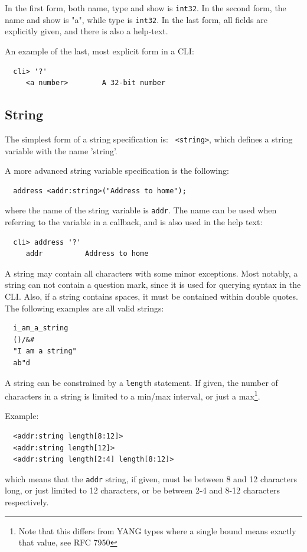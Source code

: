 \documentclass[a4paper, 10pt] {article}
\begin{document}
In the first form, both name, type and show is {\tt int32}. In the
second form, the name and show is "a", while type is {\tt int32}. 
In the last form, all fields are explicitly given, and there is also a help-text.

An example of the last, most explicit form in a CLI:
\begin{verbatim}
  cli> '?'
     <a number>        A 32-bit number
\end{verbatim}

\subsection{String}
The simplest form of a string specification is: {\tt
<string>}, which defines a string variable with the name 'string'.

A more advanced string variable specification is the following:
\begin{verbatim}
  address <addr:string>("Address to home");
\end{verbatim}
where the name of the string variable is {\tt addr}. The name can be used when referring to the variable in a callback, and is also used in the help text:
\begin{verbatim}
  cli> address '?'
     addr          Address to home
\end{verbatim}

A string may contain all characters with some minor exceptions. Most
notably, a string can not contain a question mark, since it is used
for querying syntax in the CLI.  Also, if a string contains spaces, it
must be contained within double quotes.  The following examples are all valid
strings:
\begin{verbatim}
  i_am_a_string
  ()/&#
  "I am a string"
  ab"d
\end{verbatim}

A string can be constrained by a {\tt length} statement. If given, the number of characters in a string is limited to a min/max interval, or just a max\footnote{Note that this differs from YANG types where a single bound means exactly that value, see RFC 7950}.

Example:
\begin{verbatim}
  <addr:string length[8:12]>
  <addr:string length[12]>
  <addr:string length[2:4] length[8:12]>
\end{verbatim}
which means that the {\tt addr} string, if given, must be between 8 and 12 characters long, or just limited to 12 characters, or be between 2-4 and 8-12 characters respectively.
\end{document}
